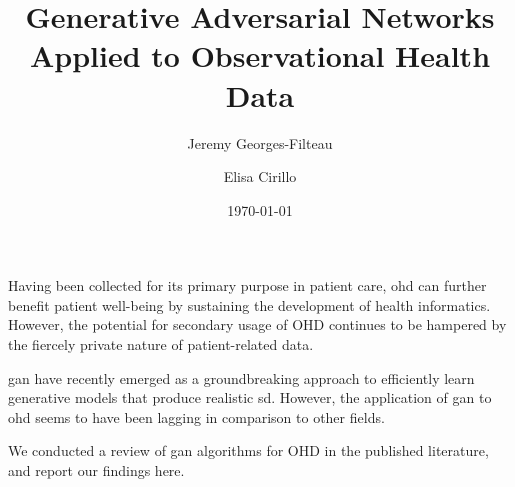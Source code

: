 \documentclass[10pt,acronym]{article}
\renewenvironment{abstract}
 {{\bfseries\noindent{\abstractname}\par\nobreak}\footnotesize}
 {\bigskip}
\begin{document}


\title{Generative Adversarial Networks Applied to Observational Health Data}

\author[1,2]{Jeremy Georges-Filteau}%
\author[2]{Elisa Cirillo}%
%
%


\vspace{-1em}

 \date{\today}

\begingroup
\let\center\flushleft
\let\endcenter\endflushleft
\maketitle
\endgroup



\begin{abstract}
Having been collected for its primary purpose in patient care,
\gls{ohd} can further benefit patient well-being
by sustaining the development of health informatics.~ However, the
potential for secondary usage of OHD continues to be hampered by the
fiercely private nature of patient-related data. ~

\gls{gan} have recently emerged as a groundbreaking approach to
efficiently learn generative models that produce realistic \gls{sd}. However, the application of \gls{gan} to \gls{ohd} seems to have been
lagging in comparison to other fields.

We conducted a review of \gls{gan} algorithms for OHD in the published
literature, and report our findings here.
\end{abstract}











\pagebreak

\printglossary[type=oalgo]
\printglossary[type=\acronymtype]

\printglossary

\pagebreak


\end{document}
